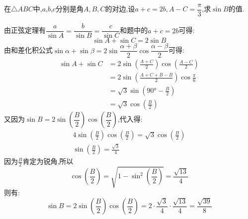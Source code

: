 \begin{questions}
\begin{solution}
\begin{enumerate}[label=\protect\circled{\arabic*}]
			      \begin{center}
			      \end{center}

		\end{enumerate}
	\end{solution}
	\question 在$\triangle{ABC}$中,$a$,$b$,$c$分别是角$A,B,C$的对边,设$a+c=2b,
		A-C=\dfrac{\pi}{3}$,求$\sin{B}$的值.

	\begin{solution}
		由正弦定理有$\dfrac{a}{\sin{A}}=\dfrac{b}{\sin{B}}=\dfrac{c}{\sin{C}}$和题中的$a+c=2b$可得:
		\begin{equation*}
			\sin{A} + \sin{C} = 2\sin{B}
		\end{equation*}
		由和差化积公式$\sin\alpha + \sin\beta = 2\sin{\dfrac{\alpha+\beta}{2}}\cos{\dfrac{\alpha-\beta}{2}}$可得:
		\begin{align*}
			\sin{A} + \sin{C} & = 2\sin \left( \frac{A+C}{2} \right)\cos \left( \frac{A-C}{2} \right) \\
			                  & = 2\sin \left( \frac{A+C+B - B}{2} \right) \cos{\frac{\pi}{6}}        \\
			                  & = \sqrt{3}\sin(\ang{90}-\frac{B}{2})                                  \\
			                  & = \sqrt{3}\cos\left(\frac{B}{2}\right)
		\end{align*}
		又因为$\sin{B}=2\sin\left(\dfrac{B}{2}\right)\cos\left(\dfrac{B}{2}\right)$,代入得:
		\begin{align*}
			4\sin\left(\frac{B}{2}\right)\cos\left(\frac{B}{2}\right) = \sqrt{3}\cos\left(\frac{B}{2}\right) \\
			\sin\left(\frac{B}{2}\right) = \frac{\sqrt{3}}{4}
		\end{align*}
		因为$\frac{B}{2}$肯定为锐角,所以
		\begin{equation*}
			\cos\left(\frac{B}{2}\right) = \sqrt{1 - \sin^2 \left(\frac{B}{2}\right)}= \frac{\sqrt{13}}{4}
		\end{equation*}
		则有:
		\begin{equation*}
			\sin{B} = 2\sin{\left( \frac{B}{2} \right)} \cos{\left( \frac{B}{2}
				\right)}=2\cdot\frac{\sqrt{3}}{4}\cdot\frac{\sqrt{13}}{4} = \frac{\sqrt{39}}{8}
		\end{equation*}
	\end{solution}


\end{questions}
